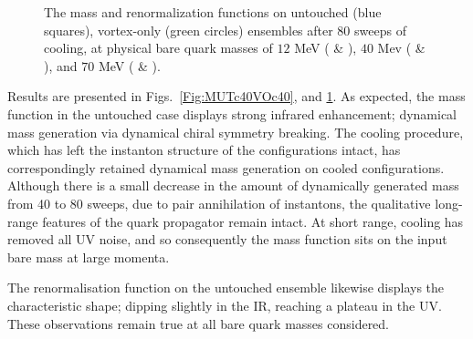 \documentclass[
 reprint,
 amsmath,amssymb,
 aps,
prd,
]{revtex4-1}
\begin{document}
\begin{figure}[thpb]
\caption{The mass and renormalization functions on untouched (blue squares), vortex-only (green circles) ensembles after 80 sweeps of cooling, at physical bare quark masses of $12$ MeV ( \& ), $40$ Mev ( \& ), and $70$ MeV ( \& ).} 
\label{Fig:MUTc80VOc80}
\end{figure}
Results are presented in Figs.~\ref{Fig:MUTc40VOc40}, and \ref{Fig:MUTc80VOc80}. As expected, the mass function in the untouched case displays strong infrared enhancement; dynamical mass generation via dynamical chiral symmetry breaking. The cooling procedure, which has left the instanton structure of the configurations intact, has correspondingly retained dynamical mass generation on cooled configurations. Although there is a small decrease in the amount of dynamically generated mass from 40 to 80 sweeps, due to pair annihilation of instantons, the qualitative long-range features of the quark propagator remain intact. At short range, cooling has removed all UV noise, and so consequently the mass function sits on the input bare mass at large momenta.\par
The renormalisation function on the untouched ensemble likewise displays the characteristic shape; dipping slightly in the IR, reaching a plateau in the UV. These observations remain true at all bare quark masses considered. \par
\end{document}
